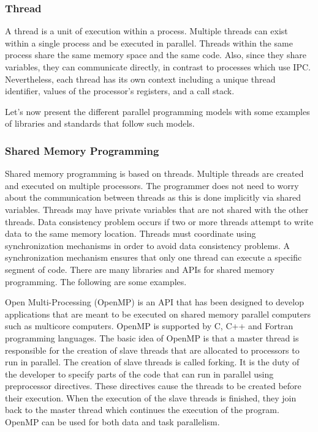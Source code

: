 \subsubsection{Thread}

A thread is a unit of execution within a process. Multiple threads can exist within a single process and be executed in parallel. Threads within the same process share the same memory space and the same code. Also, since they share variables, they can communicate directly, in contrast to processes which use IPC. Nevertheless, each thread has its own context including a unique thread identifier, values of the processor's registers, and a call stack.

Let's now present the different parallel programming models with some examples of libraries and standards that follow such models.

\subsubsection{Shared Memory Programming}

Shared memory programming is based on threads. Multiple threads are created and executed on multiple processors. The programmer does not need to worry about the communication between threads as this is done implicitly via shared variables. Threads may have private variables that are not shared with the other threads. Data consistency problem occurs if two or more threads attempt to write data to the same memory location. Threads must coordinate using synchronization mechanisms in order to avoid data consistency problems. A synchronization mechanism ensures that only one thread can execute a specific segment of code. There are many libraries and APIs for shared memory programming. The following are some examples.

Open Multi-Processing (OpenMP) \cite{openmp} is an API that has been designed to develop applications that are meant to be executed on shared memory parallel computers such as multicore computers. OpenMP is supported by C, C++ and Fortran programming languages. The basic idea of OpenMP is that a master thread is responsible for the creation of slave threads that are allocated to processors to run in parallel. The creation of slave threads is called forking. It is the duty of the developer to specify parts of the code that can run in parallel using preprocessor directives. These directives cause the threads to be created before their execution. When the execution of the slave threads is finished, they join back to the master thread which continues the execution of the program. OpenMP can be used for both data and task parallelism.

